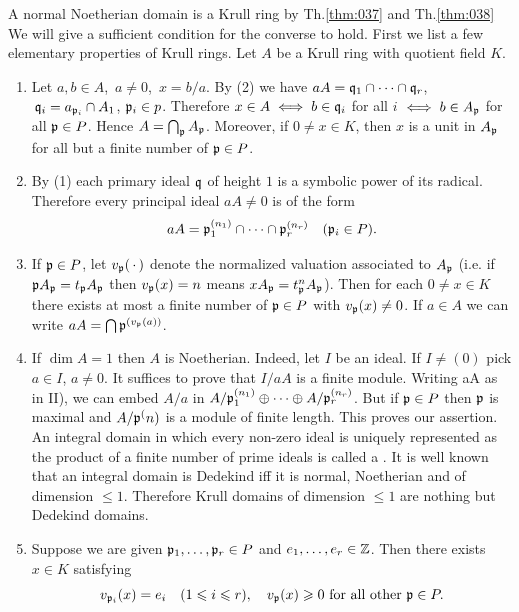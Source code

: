 \documentclass[../main]{subfiles}
\begin{document}
A normal Noetherian domain is a Krull ring by Th.\ref{thm:037} and Th.\ref{thm:038} We will give a sufficient condition for the converse to hold. First we list a few elementary properties of Krull rings. Let $A$ be a Krull ring with quotient field $K$.
\begin{enumerate}[label=\Roman*)]
    \item Let $a, b \in A$, $\, a \neq 0$, $\, x=b / a$. By (2) we have $aA =\mathfrak{q}_1 \cap \cdots \cap \mathfrak{q}_r$, $\,\mathfrak{q}_i=a_{\mathfrak{p}_i} \cap A_1$, $\mathfrak{p}_i \in p$. Therefore $x \in A\iff b \in \mathfrak{q}_i$ for all $i$ $\iff b \in A_{\mathfrak{p}}$ for all $\mathfrak{p} \in P$. Hence $A=\bigcap_{\mathfrak{p}} A_{\mathfrak{p}}$. Moreover, if $0 \neq x \in K$, then $x$ is a unit in $A_{\mathfrak{p}}$ for all but a finite number of $\mathfrak{p} \in P$.
    \item By (1) each primary ideal $\mathfrak{q}$ of height $1$ is a symbolic power of its radical. Therefore every principal ideal $aA \neq 0$ is of the form \[a A=\ideal p_1^{(n_1)} \cap \cdots \cap \ideal p_r^{(n_r)}\for{\ideal p_i \in P}.\]
    \item If $\mathfrak{p} \in P$, let $v_{\mathfrak{p}}(\,\cdot\,)$ denote the normalized valuation associated to $A_{\mathfrak{p}}$ (i.e. if $\mathfrak{p} A_{\mathfrak{p}}=t_{\mathfrak{p}} A_{\mathfrak{p}}$ then $v_{\mathfrak{p}}(x)=n$ means $xA_{\mathfrak{p}}=t_{\mathfrak{p}}^nA_{\mathfrak{p}}$). Then for each $0 \neq x \in K$ there exists at most a finite number of $\mathfrak{p} \in P$ with $v_{\mathfrak{p}}(x) \neq 0$. If $a \in A$ we can write $aA=\bigcap {\mathfrak{p}}^{(v_{\mathfrak{p}}(a))}$.
    \item If $\dim A=1$ then $A$ is Noetherian. Indeed, let $I$ be an ideal. If $I \neq(0)$ pick $a \in I$, $a \neq 0$. It suffices to prove that $I/aA$ is a finite module. Writing aA as in II), we can embed $A/a$ in $A/\mathfrak{p}_1^{(n_1)}\oplus\cdots\oplus A/\mathfrak{p}_r^{(n_r)}$. But if $\mathfrak{p} \in P$ then $\mathfrak{p}$ is maximal and $A / \mathfrak{p}^(n)$ is a module of finite length. This proves our assertion. An integral domain in which every non-zero ideal is uniquely represented as the product of a finite number of prime ideals is called a . It is well known that an integral domain is Dedekind iff it is normal, Noetherian and of dimension $\leqslant 1$. Therefore Krull domains of dimension $\leqslant 1$ are nothing but Dedekind domains.
    \item Suppose we are given $\mathfrak{p}_1, \dots, \mathfrak{p}_r \in P$ and $e_1, \dots, e_r \in \mathbb{Z}$. Then there exists $x \in K$ satisfying \[v_{\mathfrak{p}_i}(x)=e_i\quad(1 \leqslant i \leqslant r), \quad v_{\mathfrak{p}}(x) \geqslant 0\text{ for all other }\mathfrak{p} \in P.\]
\end{enumerate}
\end{document}

